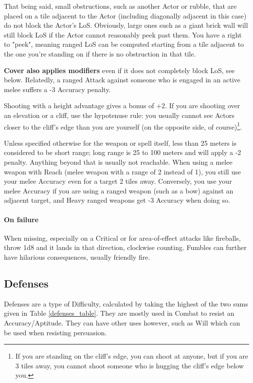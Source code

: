 That being said, small obstructions, such as another Actor or rubble, that are placed on a tile adjacent to the Actor (including diagonally adjacent in this case) do not block the Actor's LoS. Obviously, large ones such as a giant brick wall will still block LoS if the Actor cannot reasonably peek past them. You have a right to "peek", meaning ranged LoS can be computed starting from a tile adjacent to the one you're standing on if there is no obstruction in that tile. 

\textbf{Cover also applies modifiers} even if it does not completely block LoS, see below. Relatedly, a ranged Attack against someone who is engaged in an active melee suffers a -3 Accuracy penalty.

Shooting with a height advantage gives a bonus of +2. If you are shooting over an elevation or a cliff, use the hypotenuse rule: you usually cannot see Actors closer to the cliff's edge than you are yourself (on the opposite side, of course)\footnote{If you are standing on the cliff's edge, you can shoot at anyone, but if you are 3 tiles away, you cannot shoot someone who is hugging the cliff's edge below you.}. 

Unless specified otherwise for the weapon or spell itself, less than 25 meters is considered to be short range; long range is 25 to 100 meters and will apply a -2 penalty. Anything beyond that is usually not reachable. When using a melee weapon with Reach (melee weapon with a range of 2 instead of 1), you still use your melee Accuracy even for a target 2 tiles away. Conversely, you use your melee Accuracy if you are using a ranged weapon (such as a bow) against an adjacent target, and Heavy ranged weapons get -3 Accuracy when doing so. 

\paragraph{On failure} 

When missing, especially on a Critical or for area-of-effect attacks like fireballs, throw 1d8 and it lands in that direction, clockwise counting. Fumbles can further have hilarious consequences, usually friendly fire.


\subsection{Defenses}
\label{defenses}

Defenses are a type of Difficulty, calculated by taking the highest of the two sums given in Table \ref{defenses_table}. They are mostly used in Combat to resist an Accuracy/Aptitude. They can have other uses however, such as Will which can be used when resisting persuasion. 

